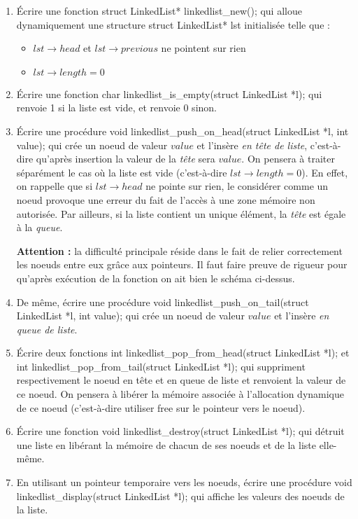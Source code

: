 \documentclass[../../../main.tex]{subfiles}
\begin{document}
\begin{enumerate}
	\begin{minipage}{\textwidth}
	\begin{center}
	
	\end{center}
	\end{minipage}
	\item Écrire une fonction \textsf{struct LinkedList* linkedlist\_new();} qui alloue dynamiquement une structure \textsf{struct LinkedList* lst} initialisée telle que :
	\begin{itemize}
		\item $lst\rightarrow head$ et $lst\rightarrow previous$ ne pointent sur rien
		\item $lst\rightarrow length = 0$
	\end{itemize}
	\item Écrire une fonction \textsf{char linkedlist\_is\_empty(struct LinkedList *l);} qui renvoie \textsf{1} si la liste est vide, et renvoie \textsf{0} sinon.
	\item Écrire une procédure \textsf{void linkedlist\_push\_on\_head(struct LinkedList *l, int value);} qui crée un noeud de valeur $value$ et l'insère \textit{en tête de liste}, c'est-à-dire qu'après insertion la valeur de la \textit{tête} sera $value$. On pensera à traiter séparément le cas où la liste est vide (c'est-à-dire $lst\rightarrow length = 0$). En effet, on rappelle que si $lst\rightarrow head$ ne pointe sur rien, le considérer comme un noeud provoque une erreur du fait de l'accès à une zone mémoire non autorisée. Par ailleurs, si la liste contient un unique élément, la \textit{tête} est égale à la \textit{queue}.

	\textbf{Attention :} la difficulté principale réside dans le fait de relier correctement les noeuds entre eux grâce aux pointeurs. Il faut faire preuve de rigueur pour qu'après exécution de la fonction on ait bien le schéma ci-dessus.
	\item De même, écrire une procédure \textsf{void linkedlist\_push\_on\_tail(struct LinkedList *l, int value);} qui crée un noeud de valeur $value$ et l'insère \textit{en queue de liste}.
	\item Écrire deux fonctions \textsf{int linkedlist\_pop\_from\_head(struct LinkedList *l);} et \textsf{int linkedlist\_pop\_from\_tail(struct LinkedList *l);} qui suppriment respectivement le noeud en tête et en queue de liste et renvoient la valeur de ce noeud. On pensera à libérer la mémoire associée à l'allocation dynamique de ce noeud (c'est-à-dire utiliser \textsf{free} sur le pointeur vers le noeud).
	\item Écrire une fonction \textsf{void linkedlist\_destroy(struct LinkedList *l);} qui détruit une liste en libérant la mémoire de chacun de ses noeuds et de la liste elle-même.
	\item En utilisant un pointeur temporaire vers les noeuds, écrire une procédure \textsf{void linkedlist\_display(struct LinkedList *l);} qui affiche les valeurs des noeuds de la liste.
\end{enumerate}
\end{document}
